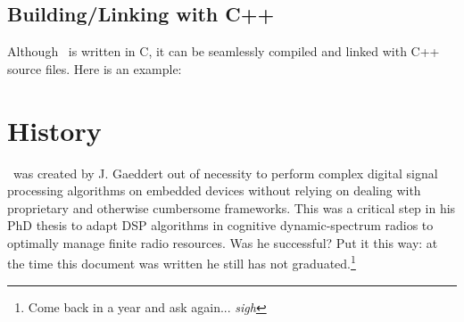 \subsection{Building/Linking with C++}
Although \liquid\ is written in C, it can be seamlessly compiled and linked
with C++ source files.
Here is an example:


\section{History}
\liquid\ was created by J. Gaeddert out of necessity to perform complex
digital signal processing algorithms on embedded devices
without relying on dealing
with proprietary and otherwise cumbersome frameworks.
This was a critical step in his PhD thesis to adapt DSP algorithms in
cognitive dynamic-spectrum radios to optimally manage finite radio resources.
Was he successful?
Put it this way: at the time this document was written he still has not
graduated.\footnote{Come back in a year and ask again... {\em sigh}}

